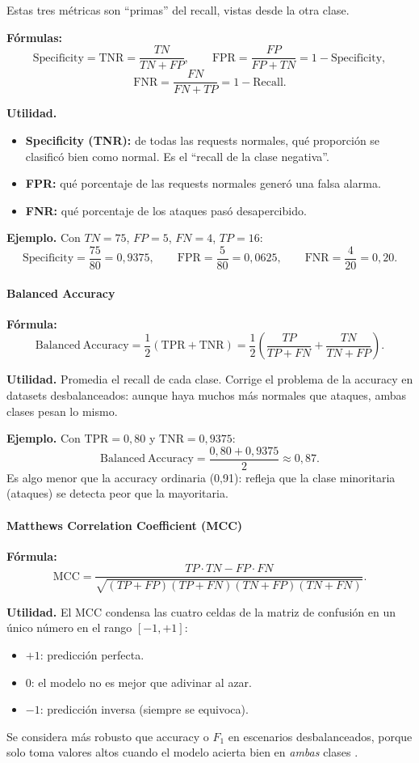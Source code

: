 \documentclass[12pt,oneside]{report}
\begin{document}
Estas tres métricas son ``primas'' del recall, vistas desde la otra clase.

\textbf{Fórmulas:}
\[
\mathrm{Specificity}=\mathrm{TNR}=\frac{TN}{TN+FP},\qquad
\mathrm{FPR}=\frac{FP}{FP+TN}=1-\mathrm{Specificity},
\]
\[
\mathrm{FNR}=\frac{FN}{FN+TP}=1-\mathrm{Recall}.
\]

\textbf{Utilidad.}
\begin{itemize}[leftmargin=*]
  \item \textbf{Specificity (TNR):} de todas las requests normales, qué
  proporción se clasificó bien como normal. Es el ``recall de la clase
  negativa''.
  \item \textbf{FPR:} qué porcentaje de las requests normales generó una
  falsa alarma.
  \item \textbf{FNR:} qué porcentaje de los ataques pasó desapercibido.
\end{itemize}

\textbf{Ejemplo.} Con $TN=75$, $FP=5$, $FN=4$, $TP=16$:
\[
\mathrm{Specificity}=\frac{75}{80}=0{,}9375,\qquad
\mathrm{FPR}=\frac{5}{80}=0{,}0625,\qquad
\mathrm{FNR}=\frac{4}{20}=0{,}20.
\]

\paragraph{Balanced Accuracy}

\textbf{Fórmula:}
\[
\mathrm{Balanced\ Accuracy}=\frac{1}{2}\left(\mathrm{TPR}+\mathrm{TNR}\right)
=\frac{1}{2}\left(\frac{TP}{TP+FN}+\frac{TN}{TN+FP}\right).
\]

\textbf{Utilidad.} Promedia el recall de cada clase. Corrige el problema
de la accuracy en datasets desbalanceados: aunque haya muchos más
normales que ataques, ambas clases pesan lo mismo.

\textbf{Ejemplo.} Con $\mathrm{TPR}=0{,}80$ y $\mathrm{TNR}=0{,}9375$:
\[
\mathrm{Balanced\ Accuracy}=\frac{0{,}80+0{,}9375}{2}\approx 0{,}87.
\]
Es algo menor que la accuracy ordinaria (0{,}91): refleja que la clase
minoritaria (ataques) se detecta peor que la mayoritaria.

\paragraph{Matthews Correlation Coefficient (MCC)}

\textbf{Fórmula:}
\[
\mathrm{MCC}=\frac{TP\cdot TN - FP\cdot FN}{\sqrt{(TP+FP)(TP+FN)(TN+FP)(TN+FN)}}.
\]

\textbf{Utilidad.} El MCC condensa las cuatro celdas de la matriz de
confusión en un único número en el rango $[-1,+1]$:
\begin{itemize}[leftmargin=*]
  \item $+1$: predicción perfecta.
  \item $0$: el modelo no es mejor que adivinar al azar.
  \item $-1$: predicción inversa (siempre se equivoca).
\end{itemize}
Se considera más robusto que accuracy o $F_1$ en escenarios
desbalanceados, porque solo toma valores altos cuando el modelo acierta
bien en \emph{ambas} clases \cite{chicco_mcc}.
\end{document}
